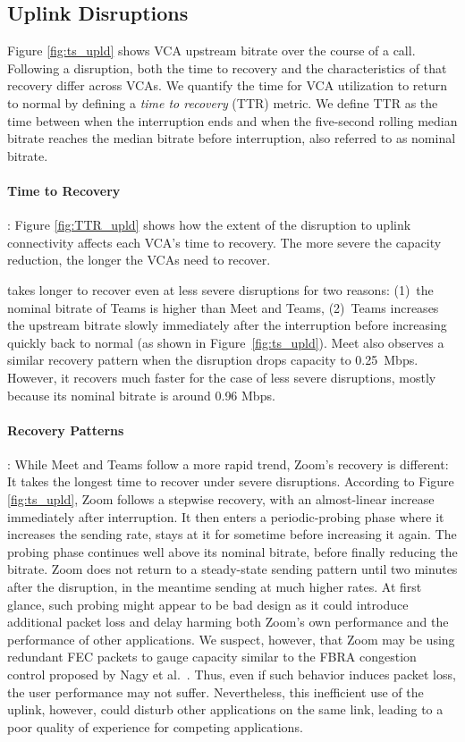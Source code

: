 \subsection{Uplink Disruptions}

Figure \ref{fig:ts_upld} shows VCA upstream bitrate over the course of a
call. Following a disruption, both the time to recovery and the
characteristics of that recovery
differ across VCAs. We quantify the time for
VCA utilization to return to normal by defining a 
\textit{time to recovery} (TTR) metric. We define TTR as the time between when the
interruption ends and when the five-second rolling median bitrate reaches the
median bitrate before interruption, also referred to as nominal bitrate. 

\paragraph{Time to Recovery}: Figure \ref{fig:TTR_upld} shows how the extent of
the disruption to uplink connectivity affects each VCA's time to recovery.
The more severe the capacity reduction, the longer the VCAs need to recover.

\teams takes longer to recover even at less severe disruptions for two
reasons: (1)~the nominal bitrate of Teams is higher than Meet and Teams,
(2)~Teams increases the upstream bitrate slowly immediately after the
interruption before increasing quickly back to normal (as shown in
Figure~\ref{fig:ts_upld}). Meet also observes a similar recovery pattern when
the disruption drops capacity to 0.25~Mbps. However, it recovers much faster
for the case of less severe disruptions, mostly because its nominal bitrate is
around 0.96 Mbps. 

\paragraph{Recovery Patterns}: While Meet and Teams follow a more rapid trend,
Zoom's recovery is different: It takes the longest time to recover under
severe disruptions. According to Figure \ref{fig:ts_upld}, Zoom follows a
stepwise recovery, with an almost-linear increase immediately after
interruption. It then enters a periodic-probing phase where it increases
the sending rate, stays at it for sometime before increasing it again. The
probing phase continues well above its nominal bitrate, before finally
reducing the bitrate.  Zoom does not return to a steady-state sending pattern
until two minutes after the disruption, in the meantime sending at much higher
rates. At first glance, such probing might appear to be bad design as it could
introduce additional packet loss and delay harming both Zoom's own performance
and the performance of other applications.  We suspect, however, that Zoom may
be using redundant FEC packets to gauge capacity similar to the
FBRA congestion control proposed by Nagy et al.~\cite{nagy2014congestion}.
Thus, even if such behavior induces packet loss, the user performance may not
suffer. Nevertheless, this inefficient use of the uplink, however, could
disturb other applications on the same link, leading to a poor quality of
experience for competing applications. 

